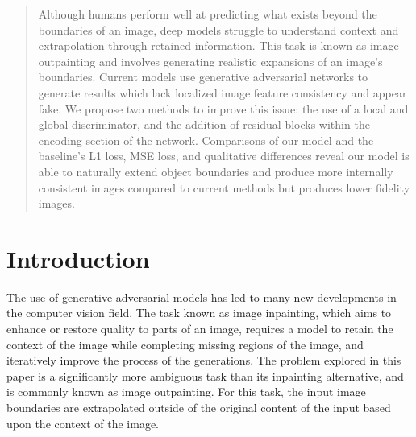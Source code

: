 \documentclass{article}
\begin{document}
\begin{abstract} 
Although humans perform well at predicting what exists beyond the boundaries of an image, deep models struggle to understand context and extrapolation through retained information. This task is known as image outpainting and involves generating realistic expansions of an image’s boundaries. Current models use generative adversarial networks to generate results which lack localized image feature consistency and appear fake. We propose two methods to improve this issue: the use of a local and global discriminator, and the addition of residual blocks within the encoding section of the network. Comparisons of our model and the baseline’s L1 loss, MSE loss, and qualitative differences reveal our model is able to naturally extend object boundaries and produce more internally consistent images compared to current methods but produces lower fidelity images.
\end{abstract} 

\section{Introduction}
The use of generative adversarial models has led to many new developments in the computer vision field. The task known as image inpainting, which aims to enhance or restore quality to parts of an image, requires a model to retain the context of the image while completing missing regions of the image, and iteratively improve the process of the generations. The problem explored in this paper is a significantly more ambiguous task than its inpainting alternative, and is commonly known as image outpainting. For this task, the input image boundaries are extrapolated outside of the original content of the input based upon the context of the image.\cite{sabini_painting_2018}
\end{document}
